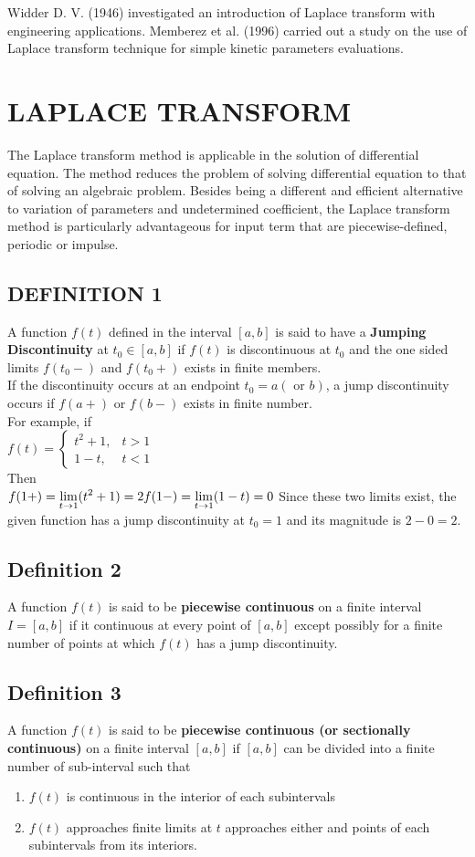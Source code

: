 \documentclass[11pt]{report}
\newcommand{\ft}{f(t)}
\newcommand{\NI}{\noindent}
\newcommand{\sps}{\\[0.2cm]}
\newcommand{\bt}[1]{\textbf{#1}}
\newcommand{\dsp}{\displaystyle}
\begin{document}
	\NI Widder D. V. (1946) investigated an introduction of Laplace transform with engineering applications.
	Memberez et al. (1996) carried out a study on the use of Laplace transform technique for simple kinetic parameters evaluations.    
	
	
	\section{LAPLACE TRANSFORM}
	The Laplace transform method is applicable in the solution of differential equation. The method reduces the problem of solving differential equation to that of solving an algebraic problem.  Besides being a different and efficient alternative to variation of parameters and undetermined coefficient, the Laplace transform method is particularly advantageous for input term that are piecewise-defined, periodic or impulse.
	
	\subsection{DEFINITION 1}
	A function $\ft$ defined in the interval $[a,b]$ is said to have a \bt{Jumping Discontinuity} at $t_0\in [a,b]$ if $\ft$ is discontinuous at $t_0$ and the one sided limits $f(t_0-)$ and $f(t_0+)$ exists in finite members.\sps
	If the discontinuity occurs at an endpoint $t_0=a(\text{ or } b)$, a jump discontinuity occurs if $f(a+)$ or $f(b-)$ exists in finite number.\sps
	For example, if\\
	$\dsp f(t) = \left\{ \begin{array}{lr}
		t^2 + 1, & t>1\\
		1-t, & t<1
	\end{array} \right.
	$\sps
	Then \sps
	$\dsp
		f(1+) = \lim\limits_{t\rightarrow 1}(t^2+1) = 2\sps
		f(1-) = \lim\limits_{t\rightarrow 1}(1-t) = 0\sps
	$
	Since these two limits exist, the given function has a jump discontinuity at $t_0=1$ and its magnitude is $2-0=2$.
	
	\subsection{Definition 2}
	A function $\ft$ is said to be \bt{piecewise continuous} on a finite interval $I=[a,b]$ if it continuous at every point of $[a,b]$ except possibly for a finite number of points at which $\ft$ has a jump discontinuity.
	
	\subsection{Definition 3}
	\label{sec:2_2_3}
	A function $\ft$ is said to be \bt{piecewise continuous (or sectionally continuous)} on a finite interval $[a,b]$ if $[a,b]$ can be divided into a finite number of sub-interval such that 
	\begin{enumerate}
		\item $\ft$ is continuous in the interior of each subintervals
		\item $\ft$ approaches finite limits at $t$ approaches either and points of each subintervals from its interiors.
	\end{enumerate}	
	
\end{document}
